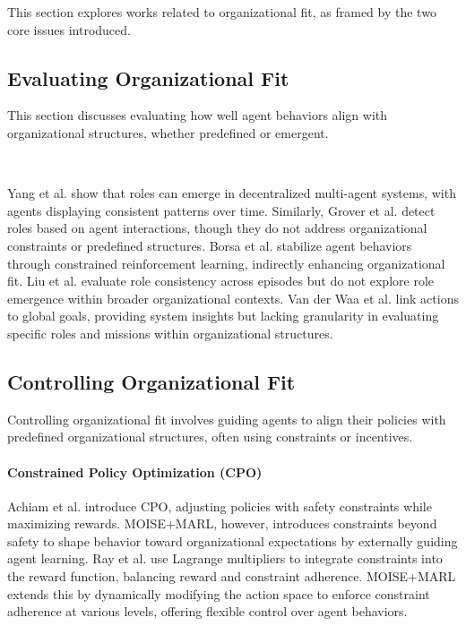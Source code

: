 \documentclass[sigconf,anonymous]{aamas}
\begin{document}
This section explores works related to organizational fit, as framed by the two core issues introduced.

\subsection{Evaluating Organizational Fit}
This section discusses evaluating how well agent behaviors align with organizational structures, whether predefined or emergent.

\

Yang et al. \cite{yang2021role} show that roles can emerge in decentralized multi-agent systems, with agents displaying consistent patterns over time. Similarly, Grover et al. \cite{grover2018role} detect roles based on agent interactions, though they do not address organizational constraints or predefined structures.
Borsa et al. \cite{borsa2019constrained} stabilize agent behaviors through constrained reinforcement learning, indirectly enhancing organizational fit. Liu et al. \cite{liu2021efficient} evaluate role consistency across episodes but do not explore role emergence within broader organizational contexts.
Van der Waa et al. \cite{van2020explainability} link actions to global goals, providing system insights but lacking granularity in evaluating specific roles and missions within organizational structures.

\subsection{Controlling Organizational Fit}
Controlling organizational fit involves guiding agents to align their policies with predefined organizational structures, often using constraints or incentives.

\paragraph{Constrained Policy Optimization (CPO)}
Achiam et al. \cite{achiam2017cpo} introduce CPO, adjusting policies with safety constraints while maximizing rewards. MOISE+MARL, however, introduces constraints beyond safety to shape behavior toward organizational expectations by externally guiding agent learning.
Ray et al. \cite{ray2019benchmarking} use Lagrange multipliers to integrate constraints into the reward function, balancing reward and constraint adherence. MOISE+MARL extends this by dynamically modifying the action space to enforce constraint adherence at various levels, offering flexible control over agent behaviors.
\end{document}
